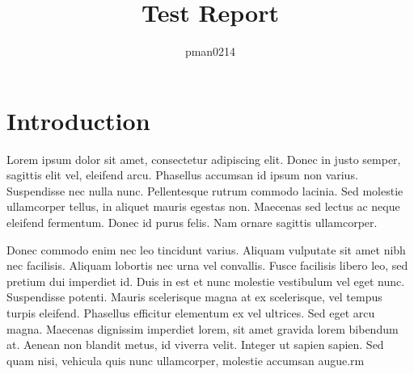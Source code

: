 \documentclass[twocolumn]{article}
\title{Test Report}
\author{pman0214}
\begin{document}
    \maketitle
    \section{Introduction}
    Lorem ipsum dolor sit amet, consectetur adipiscing elit. Donec in justo
    semper, sagittis elit vel, eleifend arcu.
    Phasellus accumsan id ipsum non varius.
    Suspendisse nec nulla nunc.
    Pellentesque rutrum commodo lacinia.
    Sed molestie ullamcorper tellus, in aliquet mauris egestas non.
    Maecenas sed lectus ac neque eleifend fermentum.
    Donec id purus felis.
    Nam ornare sagittis ullamcorper.

    Donec commodo enim nec leo tincidunt varius.
    Aliquam vulputate sit amet nibh nec facilisis.
    Aliquam lobortis nec urna vel convallis.
    Fusce facilisis libero leo, sed pretium dui imperdiet id.
    Duis in est et nunc molestie vestibulum vel eget nunc.
    Suspendisse potenti.
    Mauris scelerisque magna at ex scelerisque, vel tempus turpis eleifend.
    Phasellus efficitur elementum ex vel ultrices.
    Sed eget arcu magna.
    Maecenas dignissim imperdiet lorem, sit amet gravida lorem bibendum at.
    Aenean non blandit metus, id viverra velit.
    Integer ut sapien sapien.
    Sed quam nisi, vehicula quis nunc ullamcorper, molestie accumsan augue.rm
\end{document}

